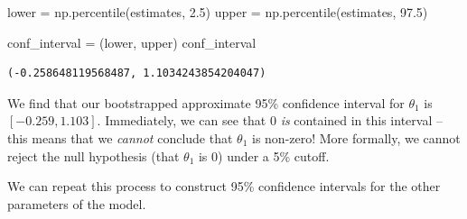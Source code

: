 \documentclass[
  letterpaper,
  DIV=11,
  numbers=noendperiod]{scrreprt}
\newenvironment{Shaded}{\begin{snugshade}}{\end{snugshade}}
\newcommand{\FloatTok}[1]{\textcolor[rgb]{0.68,0.00,0.00}{#1}}
\newcommand{\NormalTok}[1]{\textcolor[rgb]{0.00,0.23,0.31}{#1}}
\newcommand{\OperatorTok}[1]{\textcolor[rgb]{0.37,0.37,0.37}{#1}}
\begin{document}
\begin{Shaded}
\begin{Highlighting}[]
\NormalTok{lower }\OperatorTok{=}\NormalTok{ np.percentile(estimates, }\FloatTok{2.5}\NormalTok{)}
\NormalTok{upper }\OperatorTok{=}\NormalTok{ np.percentile(estimates, }\FloatTok{97.5}\NormalTok{)}

\NormalTok{conf\_interval }\OperatorTok{=}\NormalTok{ (lower, upper)}
\NormalTok{conf\_interval}
\end{Highlighting}
\end{Shaded}

\begin{verbatim}
(-0.258648119568487, 1.1034243854204047)
\end{verbatim}

We find that our bootstrapped approximate 95\% confidence interval for
\(\theta_1\) is \([-0.259, 1.103]\). Immediately, we can see that 0
\emph{is} contained in this interval -- this means that we \emph{cannot}
conclude that \(\theta_1\) is non-zero! More formally, we cannot reject
the null hypothesis (that \(\theta_1\) is 0) under a 5\% cutoff.

We can repeat this process to construct 95\% confidence intervals for
the other parameters of the model.
\end{document}

